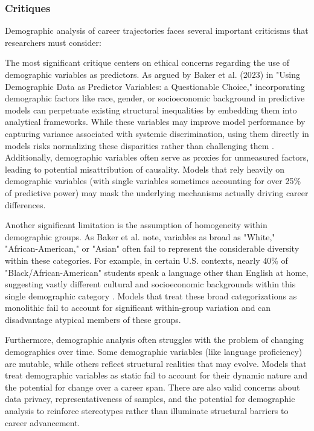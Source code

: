 \documentclass[../main.tex]{subfiles}
\begin{document}
\subsubsection{Critiques}

Demographic analysis of career trajectories faces several important criticisms that researchers must consider:

The most significant critique centers on ethical concerns regarding the use of demographic variables as predictors. As argued by Baker et al. (2023) in "Using Demographic Data as Predictor Variables: a Questionable Choice," incorporating demographic factors like race, gender, or socioeconomic background in predictive models can perpetuate existing structural inequalities by embedding them into analytical frameworks. While these variables may improve model performance by capturing variance associated with systemic discrimination, using them directly in models risks normalizing these disparities rather than challenging them \parencite{baker2023demographic}. Additionally, demographic variables often serve as proxies for unmeasured factors, leading to potential misattribution of causality. Models that rely heavily on demographic variables (with single variables sometimes accounting for over 25\% of predictive power) may mask the underlying mechanisms actually driving career differences.

Another significant limitation is the assumption of homogeneity within demographic groups. As Baker et al. note, variables as broad as "White," "African-American," or "Asian" often fail to represent the considerable diversity within these categories. For example, in certain U.S. contexts, nearly 40\% of "Black/African-American" students speak a language other than English at home, suggesting vastly different cultural and socioeconomic backgrounds within this single demographic category \parencite{baker2023demographic}. Models that treat these broad categorizations as monolithic fail to account for significant within-group variation and can disadvantage atypical members of these groups.

Furthermore, demographic analysis often struggles with the problem of changing demographics over time. Some demographic variables (like language proficiency) are mutable, while others reflect structural realities that may evolve. Models that treat demographic variables as static fail to account for their dynamic nature and the potential for change over a career span. There are also valid concerns about data privacy, representativeness of samples, and the potential for demographic analysis to reinforce stereotypes rather than illuminate structural barriers to career advancement.
\end{document}
